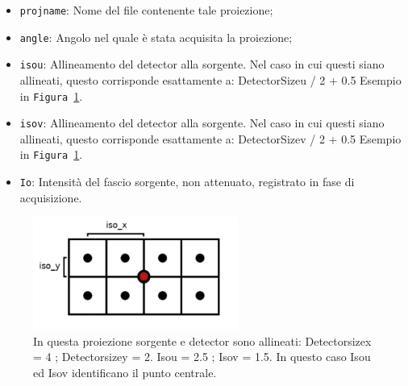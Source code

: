 \documentclass[a4paper,11pt, oneside]{article}
\begin{document}
                    \begin{itemize}
                        \item \texttt{proj\textunderscore name}: Nome del file contenente tale proiezione;
                        \item \texttt{angle}: Angolo nel quale è stata acquisita la proiezione;
                        \item \texttt{iso\textunderscore u}:  Allineamento del detector alla sorgente. Nel caso in cui questi siano allineati, questo corrisponde esattamente a:
                        \newline
                        Detector\textunderscore Size\textunderscore u / 2 + 0.5
                        \newline
                        Esempio in \texttt{Figura \ref{fig:iso}}.
                        \item \texttt{iso\textunderscore v}: Allineamento del detector alla sorgente. Nel caso in cui questi siano allineati, questo corrisponde esattamente a:
                        \newline
                        Detector\textunderscore Size\textunderscore v / 2 + 0.5
                        \newline
                        Esempio in \texttt{Figura \ref{fig:iso}}.
                        \item \texttt{Io}: Intensità del fascio sorgente, non attenuato, registrato in fase di acquisizione. 
                    \end{itemize}
                    
                    \begin{figure}[h]
                        \centering
                        \includegraphics[width=0.6\textwidth]{iso}
                        \caption{In questa proiezione sorgente e detector sono allineati: Detector\textunderscore size\textunderscore x = 4 ; Detector\textunderscore size\textunderscore y = 2. Iso\textunderscore u = 2.5 ; Iso\textunderscore v = 1.5. In questo caso Iso\textunderscore u ed Iso\textunderscore v identificano il punto centrale. }
                        \label{fig:iso}
                    \end{figure}
                    
\end{document}
